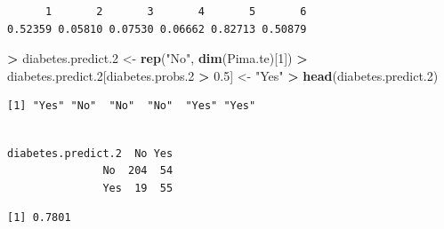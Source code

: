\documentclass[]{krantz}
\makeatletter
\newenvironment{Shaded}{\begin{snugshade}}{\end{snugshade}}
\newcommand{\KeywordTok}[1]{\textcolor[rgb]{0.27,0.27,0.27}{\textbf{#1}}}
\newcommand{\DecValTok}[1]{\textcolor[rgb]{0.06,0.06,0.06}{#1}}
\newcommand{\FloatTok}[1]{\textcolor[rgb]{0.06,0.06,0.06}{#1}}
\newcommand{\StringTok}[1]{\textcolor[rgb]{0.5,0.5,0.5}{#1}}
\newcommand{\OperatorTok}[1]{\textcolor[rgb]{0.43,0.43,0.43}{\textbf{#1}}}
\newcommand{\NormalTok}[1]{#1}
\newenvironment{kframe}{%
\medskip{}
\setlength{\fboxsep}{.8em}
 \def\at@end@of@kframe{}%
 \ifinner\ifhmode%
  \def\at@end@of@kframe{\end{minipage}}%
  \begin{minipage}{\columnwidth}%
 \fi\fi%
 \def\FrameCommand##1{\hskip\@totalleftmargin \hskip-\fboxsep
 \colorbox{shadecolor}{##1}\hskip-\fboxsep
     \hskip-\linewidth \hskip-\@totalleftmargin \hskip\columnwidth}%
 \MakeFramed {\advance\hsize-\width
   \@totalleftmargin\z@ \linewidth\hsize
   \@setminipage}}%
 {\par\unskip\endMakeFramed%
 \at@end@of@kframe}
\renewenvironment{Shaded}{\begin{kframe}}{\end{kframe}}
\makeatother
\begin{document}
\begin{verbatim}
      1       2       3       4       5       6 
0.52359 0.05810 0.07530 0.06662 0.82713 0.50879 
\end{verbatim}

\begin{Shaded}
\begin{Highlighting}[]
\OperatorTok{>}\StringTok{ }\NormalTok{diabetes.predict.}\DecValTok{2}\NormalTok{ <-}\StringTok{ }\KeywordTok{rep}\NormalTok{(}\StringTok{"No"}\NormalTok{, }\KeywordTok{dim}\NormalTok{(Pima.te)[}\DecValTok{1}\NormalTok{])}
\OperatorTok{>}\StringTok{ }\NormalTok{diabetes.predict.}\DecValTok{2}\NormalTok{[diabetes.probs.}\DecValTok{2} \OperatorTok{>}\StringTok{ }\FloatTok{0.5}\NormalTok{] <-}\StringTok{ "Yes"}
\OperatorTok{>}\StringTok{ }\KeywordTok{head}\NormalTok{(diabetes.predict.}\DecValTok{2}\NormalTok{)}
\end{Highlighting}
\end{Shaded}

\begin{verbatim}
[1] "Yes" "No"  "No"  "No"  "Yes" "Yes"
\end{verbatim}

\begin{Shaded}
\end{Shaded}

\begin{verbatim}
                  
diabetes.predict.2  No Yes
               No  204  54
               Yes  19  55
\end{verbatim}

\begin{Shaded}
\end{Shaded}

\begin{verbatim}
[1] 0.7801
\end{verbatim}
\end{document}
